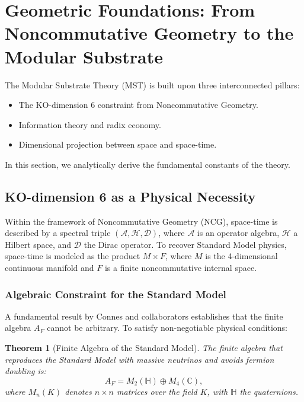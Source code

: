 \documentclass[11pt, a4paper]{article}
\theoremstyle{plain}
\newtheorem{theorem}{Theorem}[section]
\theoremstyle{definition}
\begin{document}

\section{Geometric Foundations: From Noncommutative Geometry to the Modular Substrate}
\label{sec:foundations}

The Modular Substrate Theory (MST) is built upon three interconnected pillars:

\begin{itemize}
    \item The KO-dimension 6 constraint from Noncommutative Geometry.
    \item Information theory and radix economy.
    \item Dimensional projection between space and space-time.
\end{itemize}

In this section, we analytically derive the fundamental constants of the theory.

\subsection{KO-dimension 6 as a Physical Necessity}

Within the framework of Noncommutative Geometry (NCG), space-time is described by a spectral triple $(\mathcal{A}, \mathcal{H}, \mathcal{D})$, where $\mathcal{A}$ is an operator algebra, $\mathcal{H}$ a Hilbert space, and $\mathcal{D}$ the Dirac operator. To recover Standard Model physics, space-time is modeled as the product $M \times F$, where $M$ is the 4-dimensional continuous manifold and $F$ is a finite noncommutative internal space.

\subsubsection{Algebraic Constraint for the Standard Model}

A fundamental result by Connes and collaborators \cite{Connes2012, Chamseddine2012} establishes that the finite algebra $A_F$ cannot be arbitrary. To satisfy non-negotiable physical conditions:

\begin{theorem}[Finite Algebra of the Standard Model]
The finite algebra that reproduces the Standard Model with massive neutrinos and avoids fermion doubling is:
\begin{equation}
A_F = M_2(\mathbb{H}) \oplus M_4(\mathbb{C}),
\end{equation}
where $M_n(K)$ denotes $n\times n$ matrices over the field $K$, with $\mathbb{H}$ the quaternions.
\end{theorem}
\end{document}
